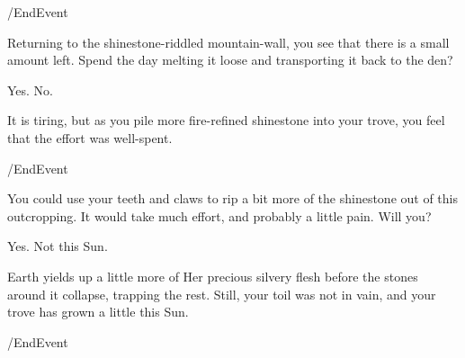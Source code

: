\option /EndEvent  
	  



 
Returning to the shinestone-riddled mountain-wall, you see that there is a small
amount left. Spend the day melting it loose and transporting it back to the den?

\option Yes.
	  
\option No.   

It is tiring, but as you pile more fire-refined shinestone into your trove, you
feel that the effort was well-spent.

\option /EndEvent  
	  


 
You could use your teeth and claws to rip a bit more of the shinestone out of
this outcropping. It would take much effort, and probably a little pain. Will
you?

\option Yes.
	 
	 
\option Not this Sun.
	  

Earth yields up a little more of Her precious silvery flesh before the stones
around it collapse, trapping the rest. Still, your toil was not in vain, and
your trove has grown a little this Sun.

\option /EndEvent  
	  


